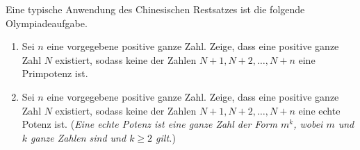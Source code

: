 Eine typische Anwendung des Chinesischen Restsatzes ist die folgende Olympiadeaufgabe.
\begin{aufgabe*}\leavevmode\label{aufgabe:ChinesischerRestsatz}
	\begin{enumerate}[label={$(\alph*)$},ref={$(\alph*)$}]
		\item Sei $n$ eine vorgegebene positive ganze Zahl. Zeige, dass eine positive ganze Zahl $N$ existiert, sodass keine der Zahlen $N+1,N+2,\dotsc,N+n$ eine Primpotenz ist.\label{teilaufgabe:Primpotenzen}
		\item Sei $n$ eine vorgegebene positive ganze Zahl. Zeige, dass eine positive ganze Zahl $N$ existiert, sodass keine der Zahlen $N+1,N+2,\dotsc,N+n$ eine echte Potenz ist. (\emph{Eine echte Potenz ist eine ganze Zahl der Form $m^k$, wobei $m$ und $k$ ganze Zahlen sind und $k\geqslant 2$ gilt.})\label{teilaufgabe:EchtePotenzen}
	\end{enumerate}
\end{aufgabe*}

